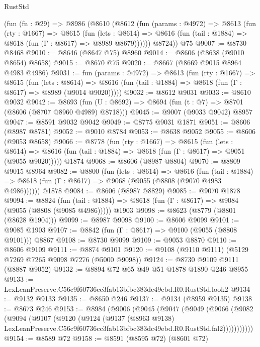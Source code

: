 \begin{lexlean}{RustStd}
\begin{coremodule}
    (fun (fn : @29) =>
    @8986
      (@8610
        (@8612
          (fun (params : @4972) =>
          @8613
            (fun (rty : @1667) =>
            @8615
              (fun (lets : @8614) =>
              @8616 (fun (tail : @1884) => @8618 (fun (Γ : @8617) => @8989 @8679))))))
        @8724))
    @75
@9007 := @8730 @8468
@9010 := @8646 (@8647 @75) @8960
@9014 := @8606 (@8638 (@9010 @8654) @8658)
@9015 := @8670 @75
@9020 := @8667 (@8669 @9015 @8964 @4983 @4986)
@9031 := fun (params : @4972) =>
  @8613
    (fun (rty : @1667) =>
    @8615
      (fun (lets : @8614) =>
      @8616 (fun (tail : @1884) => @8618 (fun (Γ : @8617) => @8989 (@9014 @9020)))))
@9032 := @8612 @9031
@9033 := @8610 @9032
@9042 := @8693 (fun (U : @8692) => @8694 (fun (t : @7) => @8701 (@8606 (@8707 @8960 @4989) @8718)))
@9045 := @9007 (@9033 @9042) @8957
@9047 := @8591 @9032 @9042
@9049 := @8775 @9031 @1871
@9051 := @8606 (@8987 @8781)
@9052 := @9010 @8784
@9053 := @8638 @9052
@9055 := @8606 (@9053 @8658)
@9066 := @8778
    (fun (rty : @1667) =>
    @8615
      (fun (lets : @8614) =>
      @8616 (fun (tail : @1884) => @8618 (fun (Γ : @8617) => @9051 (@9055 @9020)))))
    @1874
@9068 := @8606 (@8987 @8804)
@9070 := @8809 @9015 @8964
@9082 := @8800
    (fun (lets : @8614) =>
    @8616
      (fun (tail : @1884) => @8618 (fun (Γ : @8617) => @9068 (@9055 (@8808 (@9070 @4983 @4986))))))
    @1878
@9084 := @8606 (@8987 @8829)
@9085 := @9070 @1878
@9094 := @8824
    (fun (tail : @1884) => @8618 (fun (Γ : @8617) => @9084 (@9055 (@8808 (@9085 @4986)))))
    @1903
@9098 := @8623 (@8779 (@8801 (@8628 @1904)))
@9099 := @8987 @9098
@9100 := @8606 @9099
@9101 := @9085 @1903
@9107 := @8842 (fun (Γ : @8617) => @9100 (@9055 (@8808 @9101))) @8867
@9108 := @8730 @9099
@9109 := @9053 @8870
@9110 := @8606 @9109
@9111 := @8874 @9101
@9120 := @9108 (@9110 @9111) (@5129 @7269 @7265 @9098 @7276 (@5000 @9098))
@9124 := @8730 @9109 @9111 (@8887 @9052)
@9132 := @8894 @72 @65 @49 @51 @1878 @1890 @246 @8955
@9133 := LexLeanPreserve.C56c9f60736cc3fab13bfbc383dc49ebd.R0.RustStd.look2
@9134 := @9132 @9133
@9135 := @8650 @246
@9137 := @9134 (@8959 @9135)
@9138 := @8673 @246
@9153 := @8984
    (@9006
      (@9045
        (@9047
          (@9049
            (@9066
              (@9082
                (@9094
                  (@9107
                    (@9120
                      (@9124
                        (@9137
                          (@8963 @9138)
                          LexLeanPreserve.C56c9f60736cc3fab13bfbc383dc49ebd.R0.RustStd.fal2)))))))))))
@9154 := @8589 @72
@9158 := @8591 (@8595 @72) (@8601 @72)

\end{coremodule}
\end{lexlean}
